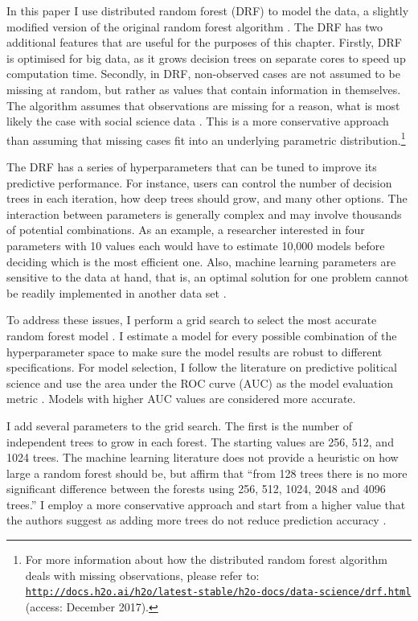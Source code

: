 In this paper I use distributed random forest (DRF) to model the data, a slightly modified version of the original random forest algorithm \citep{h2o2017}. The DRF has two additional features that are useful for the purposes of this chapter. Firstly, DRF is optimised for big data, as it grows decision trees on separate cores to speed up computation time. Secondly, in DRF, non-observed cases are not assumed to be missing at random, but rather as values that contain information in themselves. The algorithm assumes that observations are missing for a reason, what is most likely the case with social science data \citep{lall2016multiple}. This is a more conservative approach than assuming that missing cases fit into an underlying parametric distribution.\footnote{For more information about how the distributed random forest algorithm deals with missing observations, please refer to: \href{http://docs.h2o.ai/h2o/latest-stable/h2o-docs/data-science/drf.html}{\texttt{http://docs.h2o.ai/h2o/latest-stable/h2o-docs/data-science/drf.html}} (access: December 2017).}
	
The DRF has a series of hyperparameters that can be tuned to improve its predictive performance. For instance, users can control the number of decision trees in each iteration, how deep trees should grow, and many other options. The interaction between parameters is generally complex and may involve thousands of potential combinations. As an example, a researcher interested in four parameters with 10 values each would have to estimate 10,000 models before deciding which is the most efficient one. Also, machine learning parameters are sensitive to the data at hand, that is, an optimal solution for one problem cannot be readily implemented in another data set \citep{genuer2008random,goldstein2010application,jones2015exploratory}.
	
To address these issues, I perform a grid search to select the most accurate random forest model \citep[123]{cook2017h2o}. I estimate a model for every possible combination of the hyperparameter space to make sure the model results are robust to different specifications. For model selection, I follow the literature on predictive political science and use the area under the ROC curve (AUC) as the model evaluation metric \citep[e.g.,][]{hill2014empirical,ward2010perils,ward2013learning}. Models with higher AUC values are considered more accurate.
	
I add several parameters to the grid search. The first is the number of independent trees to grow in each forest. The starting values are 256, 512, and 1024 trees. The machine learning literature does not provide a heuristic on how large a random forest should be, but \citet[166]{oshiro2012many} affirm that ``from 128 trees there is no more significant difference between the forests using 256, 512, 1024, 2048 and 4096 trees.'' I employ a more conservative approach and start from a higher value that the authors suggest as adding more trees do not reduce prediction accuracy \citep[7]{breiman2001statistical}.
	
